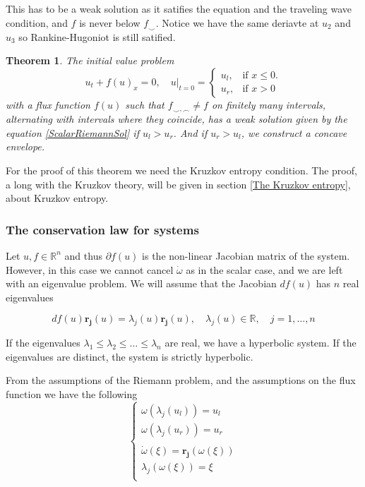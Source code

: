 \documentclass{article}
\newtheorem{theorem}{Theorem}[section]
\numberwithin{equation}{section}
\begin{document}
 This has to be a weak solution as it satifies the equation and the traveling wave condition, and $f$ is never below $f_{\smile}$. Notice we have the same deriavte at $u_2$ and $u_3$ so Rankine-Hugoniot is still satified. 
 

\begin{theorem}
The initial value problem
\begin{equation}
    u_t + f(u)_x = 0,  \quad u|_{t = 0 } = \begin{cases} u_l, & \text{if $x \leq 0$}.\\ u_r, & \text{if $x>0$} 
 \end{cases}
\end{equation}
 with a flux function $f(u)$ such that $f_{\smile,\frown} \neq f$ on finitely many intervals, alternating with intervals where they coincide, has a weak solution given by the equation \ref{ScalarRiemannSol} if $u_l > u_r$. And if $u_r > u_l$, we construct a concave envelope.  
\label{RP_Kruzkov_sol}
\end{theorem}

For the proof of this theorem we need the Kruzkov entropy condition. The proof, a long with the Kruzkov theory, will be given in section \ref{The Kruzkov entropy}, about Kruzkov entropy. 



\subsubsection{The conservation law for systems }
Let $u, f \in \mathbb{R}^n$ and thus $\partial f(u)$ is the non-linear Jacobian matrix of the system. However, in this case we cannot cancel $ \dot \omega$ as in the scalar case, and we are left with an eigenvalue problem. We will assume that the Jacobian $df(u)$ has $n$ real eigenvalues 

\begin{equation}
    df(u)\boldsymbol{r_j}(u) = \lambda_j(u)\boldsymbol{r_j}(u), \quad \lambda_j(u) \in \mathbb{R}, \quad j = 1, \dots, n 
    \label{Eig.val problem}
\end{equation}


If the eigenvalues $\lambda_1 \leq \lambda_2 \leq \dots \leq \lambda_n $ are real, we have a hyperbolic system. If the eigenvalues are distinct, the system is strictly hyperbolic. 

From the assumptions of the Riemann problem, and the assumptions on the flux function we have the following 
\begin{equation*}
    \begin{cases}
    \omega( \lambda_j( u_l) ) = u_l \\
    \omega( \lambda_j( u_r) ) = u_r \\
    \\
    \dot \omega( \xi ) = \boldsymbol{r_j}( \omega(\xi)) \\
    \lambda_j (\omega(\xi)) = \xi \\
    \end{cases}
\end{equation*}
\end{document}
